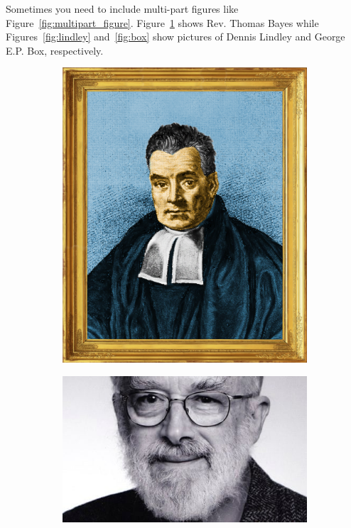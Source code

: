 \documentclass[12pt, twoside]{article}
\begin{document}
Sometimes you need to include multi-part figures like Figure~\ref{fig:multipart_figure}.
Figure~\ref{fig:bayes2} shows Rev. Thomas Bayes while Figures~\ref{fig:lindley} and~\ref{fig:box} show pictures of Dennis Lindley and George E.P. Box, respectively.
\begin{figure}[H]
\begin{subfigure}[b]{0.32\textwidth}
\centering
\includegraphics[width = \textwidth]{bayes}
\caption{}
\label{fig:bayes2}
\end{subfigure}
\begin{subfigure}[b]{0.32\textwidth}
\centering
\includegraphics[width = \textwidth]{lindley}

\end{subfigure}
\end{figure}
\end{document}
